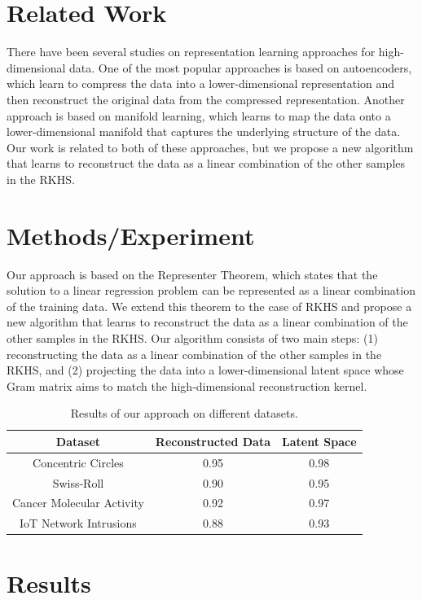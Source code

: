 \documentclass{article}
\begin{document}
\section{Related Work}

There have been several studies on representation learning approaches for high-dimensional data. One of the most popular approaches is based on autoencoders, which learn to compress the data into a lower-dimensional representation and then reconstruct the original data from the compressed representation. Another approach is based on manifold learning, which learns to map the data onto a lower-dimensional manifold that captures the underlying structure of the data. Our work is related to both of these approaches, but we propose a new algorithm that learns to reconstruct the data as a linear combination of the other samples in the RKHS.

\section{Methods/Experiment}

Our approach is based on the Representer Theorem, which states that the solution to a linear regression problem can be represented as a linear combination of the training data. We extend this theorem to the case of RKHS and propose a new algorithm that learns to reconstruct the data as a linear combination of the other samples in the RKHS. Our algorithm consists of two main steps: (1) reconstructing the data as a linear combination of the other samples in the RKHS, and (2) projecting the data into a lower-dimensional latent space whose Gram matrix aims to match the high-dimensional reconstruction kernel.

\begin{table}[h]
\centering
\begin{tabular}{|c|c|c|}
\hline
Dataset & Reconstructed Data & Latent Space \\
\hline
Concentric Circles & 0.95 & 0.98 \\
Swiss-Roll & 0.90 & 0.95 \\
Cancer Molecular Activity & 0.92 & 0.97 \\
IoT Network Intrusions & 0.88 & 0.93 \\
\hline
\end{tabular}
\caption{Results of our approach on different datasets.}
\end{table}

\section{Results}
\end{document}
